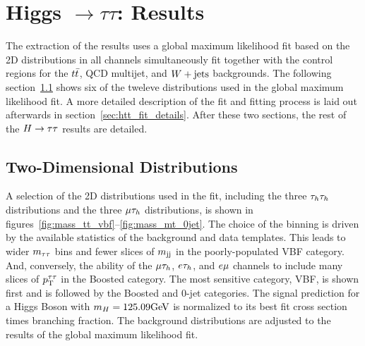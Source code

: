 
\chapter{Higgs $\to \tau\tau$: Results}

The extraction of the results uses a global maximum likelihood fit based on the 2D distributions in all 
channels simultaneously fit together with the control regions for the $t\bar{t}$, QCD multijet, and $W +\text{jets}$ backgrounds. 
The following section~\ref{sec:htt_2d} shows six of the tweleve distributions used in the
global maximum likelihood fit. A more detailed description of the fit and fitting process is 
laid out afterwards in section~\ref{sec:htt_fit_details}. After these two sections,
the rest of the $H\to\tau\tau$ results are detailed.


\section{Two-Dimensional Distributions}
\label{sec:htt_2d}
A selection of the 2D distributions used in the fit, including the three $\tau_{h}\tau_{h}$ distributions and
the three $\mu\tau_{h}$ distributions, is shown in figures~\ref{fig:mass_tt_vbf}--\ref{fig:mass_mt_0jet}.
The choice of the binning is driven by the available statistics of the background and data templates. This leads to wider 
$m_{\tau\tau}$ bins and fewer slices of $m_\mathrm{jj}$ in the poorly-populated VBF category. And, conversely, the ability of the $\mu\tau_{h}$,
$e\tau_{h}$, and $e\mu$ channels to include many slices of $p_\mathrm{T}^{\tau\tau}$ in the Boosted category. 
The most sensitive category, VBF, is shown first and is followed by the Boosted and 0-jet categories.
The signal prediction for a Higgs Boson with $m_{H} = 125.09\mathrm{GeV}$ is normalized to its best fit cross section times branching fraction.
The background distributions are adjusted to the results of the global maximum likelihood fit.

